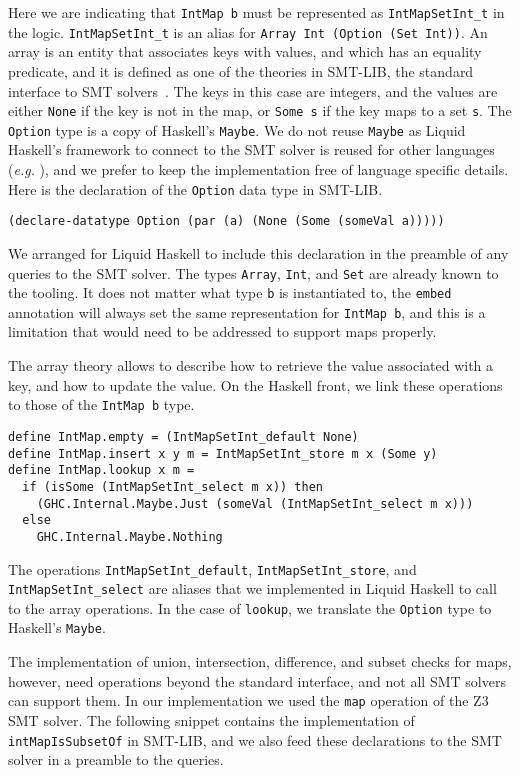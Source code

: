 \documentclass[sigconf]{acmart}
\newcommand{\tc}[1]{{\small\texttt{#1}}}
\begin{document}
Here we are indicating that \tc{IntMap b} must be represented as \tc{IntMapSetInt\_t}
in the logic. \tc{IntMapSetInt\_t} is an alias for \tc{Array Int (Option (Set Int))}.
An array is an entity that associates keys with values, and which has an equality predicate,
and it is defined as one of the theories in SMT-LIB, the standard interface
to SMT solvers~\cite{BarFT-RR-25}.
The keys in this case are integers, and the values are either \tc{None} if the key
is not in the map, or \tc{Some s} if the key maps to a set \tc{s}. The
\tc{Option} type is a copy of Haskell's \tc{Maybe}.
We do not reuse \tc{Maybe} as Liquid Haskell's framework to connect to the SMT solver is
reused for other languages (\emph{e.g.} \cite{lehmann23}), and we prefer to keep
the implementation free of language specific details.
Here is the declaration of the \tc{Option} data type in SMT-LIB.

\begin{verbatim}
(declare-datatype Option (par (a) (None (Some (someVal a)))))
\end{verbatim}

We arranged for Liquid Haskell to include this declaration in the preamble of any
queries to the SMT solver. The types \tc{Array}, \tc{Int}, and \tc{Set} are already
known to the tooling.
It does not matter what type \tc{b} is instantiated to, the \tc{embed} annotation will
always set the same representation for \tc{IntMap b}, and this is a limitation that
would need to be addressed to support maps properly.

The array theory allows to describe how to retrieve the value associated with
a key, and how to update the value. On the Haskell front, we link these operations
to those of the \tc{IntMap b} type.

\begin{verbatim}
define IntMap.empty = (IntMapSetInt_default None)
define IntMap.insert x y m = IntMapSetInt_store m x (Some y)
define IntMap.lookup x m =
  if (isSome (IntMapSetInt_select m x)) then
    (GHC.Internal.Maybe.Just (someVal (IntMapSetInt_select m x)))
  else
    GHC.Internal.Maybe.Nothing
\end{verbatim}

The operations \tc{IntMapSetInt\_default}, \tc{IntMapSetInt\_store}, and \tc{IntMapSetInt\_select}
are aliases that we implemented in Liquid Haskell to call to the array operations.
In the case of \tc{lookup}, we translate the \tc{Option} type to Haskell's \tc{Maybe}.

The implementation of union, intersection,
difference, and subset checks for maps, however,
need operations beyond the standard interface, and not all SMT solvers can support
them. In our implementation we used the \tc{map} operation of the
Z3 SMT solver. The following snippet contains the implementation of
\tc{intMapIsSubsetOf} in SMT-LIB, and we also feed these declarations to the
SMT solver in a preamble to the queries.
\end{document}
